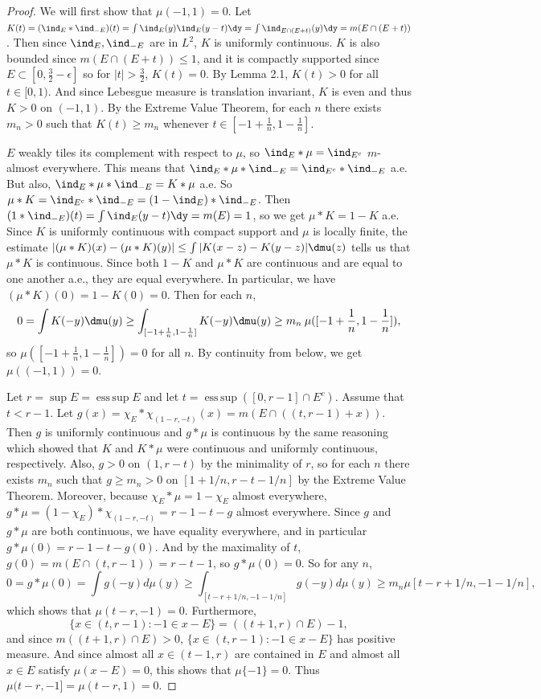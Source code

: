 \documentclass{amsart}
\DeclareMathOperator{\esssup}{ess\,sup}
\begin{document}
\begin{proof}
    We will first show that $\mu(-1,1)=0$. Let $K(t) = (\ind_E \ast \ind_{-E})(t) = \int \ind_E(y) \ind_{E}(y-t) \dy = \int \ind_{E \cap (E+t)}(y) \dy = m(E \cap (E+t))$. Then since $\ind_E, \ind_{-E}$ are in $L^2$, $K$ is uniformly continuous. $K$ is also bounded since $m(E \cap (E+t)) \le 1$, and it is compactly supported since $E \subset [0, \frac 32 - \epsilon]$ so for $|t| > \frac 3 2$, $K(t) = 0$. By Lemma 2.1, $K(t) > 0$ for all $t \in [0,1)$. And since Lebesgue measure is translation invariant, $K$ is even and thus $K>0$ on $(-1,1)$. By the Extreme Value Theorem, for each $n$ there exists $m_n>0$ such that $K(t) \ge m_n$ whenever $t \in [-1+\frac{1}{n}, 1 - \frac 1 n]$. 
    
    $E$ weakly tiles its complement with respect to $\mu$, so $\ind_E \ast \mu = \ind_{E^c}$ $m$-almost everywhere.   This means that $\ind_E \ast \mu \ast \ind_{-E} = \ind_{E^c} \ast \ind_{-E}$ a.e. But also, $\ind_E \ast \mu \ast \ind_{-E} = K \ast \mu$ a.e. So $\mu \ast K = \ind_{E^c} \ast \ind_{-E} = (1 - \ind_E) \ast \ind_{-E}$. Then $(1 \ast \ind_{-E})(t) = \int \ind_E(y-t) \dy =m(E)= 1$, so we get $\mu \ast K = 1 - K$ a.e. Since $K$ is uniformly continuous with compact support and $\mu$ is locally finite, the estimate $|(\mu \ast K)(x) - (\mu \ast K)(y)| \le \int |K(x-z) - K(y-z)| \dmu(z)$ tells us that $\mu*K$ is continuous. Since both $1-K$ and $\mu*K$ are continuous and are equal to one another a.e., they are equal everywhere. In particular, we have $(\mu \ast K)(0) = 1 - K(0) = 0$. Then for each $n$, $$0 = \int K(-y) \dmu(y) \ge \int_{[-1 + \frac 1 n, 1-\frac{1}{n}]} K(-y) \dmu(y) \ge m_n \: \mu([-1+\frac 1 n, 1-\frac{1}{n}]),$$ so $\mu([-1 + \frac 1 n, 1-\frac{1}{n}]) = 0$ for all $n$. By continuity from below, we get $\mu((-1, 1)) = 0$. 
    
    Let $r=\sup E=\esssup E$ and let $t=\esssup\left([0,r-1]\cap E^c\right)$. Assume that $t<r-1$. Let $g(x)=\chi_E*\chi_{(1-r,-t)}(x)=m(E\cap((t,r-1)+x))$. Then $g$ is uniformly continuous and $g*\mu$ is continuous by the same reasoning which showed that $K$ and $K*\mu$ were continuous and uniformly continuous, respectively. Also, $g>0$ on $(1,r-t)$ by the minimality of $r$, so for each $n$ there exists $m_n$ such that $g\ge m_n>0$ on $[1+1/n,r-t-1/n]$ by the Extreme Value Theorem. Moreover, because $\chi_E*\mu=1-\chi_E$ almost everywhere, $g*\mu=(1-\chi_E)*\chi_{(1-r,-t)}=r-1-t-g$ almost everywhere. Since $g$ and $g*\mu$ are both continuous, we have equality everywhere, and in particular $g*\mu(0)=r-1-t-g(0)$. And by the maximality of $t$, $g(0)=m(E\cap(t,r-1))=r-t-1$, so $g*\mu(0)=0$. So for any $n$,
    $$0=g*\mu(0)=\int g(-y)d\mu(y)\ge \int_{[t-r+1/n,-1-1/n]}g(-y)d\mu(y)\ge m_n\mu[t-r+1/n,-1-1/n],$$
    which shows that $\mu(t-r,-1)=0$. Furthermore,
    $$\{x\in (t,r-1):-1\in x-E\}=\left((t+1,r)\cap E\right)-1,$$
    and since $m((t+1,r)\cap E)>0$, $\{x\in (t,r-1):-1\in x-E\}$ has positive measure. And since almost all $x\in (t-1,r)$ are contained in $E$ and almost all $x\in E$ satisfy $\mu(x-E)=0$, this shows that $\mu\{-1\}=0$. Thus $\mu(t-r,-1]=\mu(t-r,1)=0$.


\end{proof}
\end{document}
